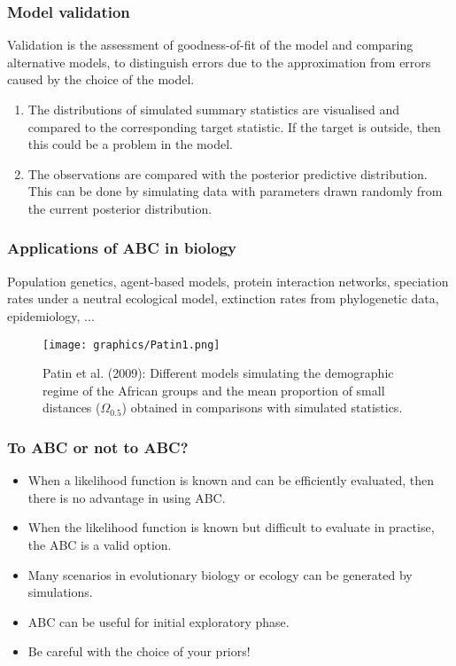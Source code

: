 \documentclass{beamer}
\newcommand{\1}{\ensuremath{\mathbf{1}}}
\begin{document}
%
%
%
\begin{frame}\frametitle{Model validation}
	Validation is the assessment of goodness-of-fit of the model and comparing alternative models, to distinguish errors due to the approximation from errors caused by the choice of the model.
	\begin{enumerate}
		\item The distributions of simulated summary statistics are visualised and compared to the corresponding target statistic. If the target is outside, then this could be a problem in the model.
		\item The observations are compared with the posterior predictive distribution. This can be done by simulating data with parameters drawn randomly from the current posterior distribution.
	\end{enumerate}
\end{frame}
%
%
%
\begin{frame}\frametitle{Applications of ABC in biology}
	Population genetics, agent-based models, protein interaction networks, speciation rates under a neutral ecological model, extinction rates from phylogenetic data, epidemiology, ...
	\begin{figure}
	\begin{center}
		\texttt{[image: graphics/Patin1.png]}
	\end{center}
	\caption{Patin et al. (2009): Different models simulating the demographic regime of the African groups and the mean proportion of small distances ($\Omega_{0.5}$) obtained in comparisons with simulated statistics.}
	\end{figure}
\end{frame}
%
%
%
\begin{frame}\frametitle{To ABC or not to ABC?}
	\begin{itemize}
		\item When a likelihood function is known and can be efficiently evaluated, then there is no advantage in using ABC.
		\item When the likelihood function is known but difficult to evaluate in practise, the ABC is a valid option.
		\item Many scenarios in evolutionary biology or ecology can be generated by simulations.
		\item ABC can be useful for initial exploratory phase.
		\item Be careful with the choice of your priors!
	\end{itemize}
\end{frame}
\end{document}
